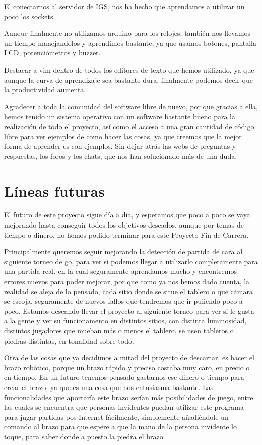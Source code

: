 \documentclass[12pt,a4paper]{report}
\begin{document}
El conectarnos al servidor de IGS, nos ha hecho que aprendamos a utilizar un
poco los sockets.

Aunque finalmente no utilizamos arduino para los relojes, también nos llevamos
un tiempo manejandolos y aprendimos bastante, ya que usamos botones, pantalla
LCD, potenciómetros y buzzer.

Destacar a vim dentro de todos los editores de texto que hemos utilizado, ya que
aunque la curva de aprendizaje sea bastante dura, finalmente podemos decir que
la productividad aumenta. 

Agradecer a toda la comunidad del software libre de nuevo, por que gracias a
ella, hemos tenido un sistema operativo con un software bastante bueno para la
realización de todo el proyecto, así como el acceso a una gran cantidad de
código libre para ver ejemplos de como hacer las cosas, ya que creemos que la
mejor forma de aprender es con ejemplos. Sin dejar atrás las webs de preguntas y
respuestas, los foros y los chats, que nos han solucionado más de una duda. 



\chapter{Líneas futuras}

El futuro de este proyecto sigue día a día, y esperamos que poco a poco se vaya
mejorando hasta conseguir todos los objetivos deseados, aunque por temas de
tiempo o dinero, no hemos podido terminar para este Proyecto Fin de Carrera. 

Principalmente queremos seguir mejorando la detección de partida de cara al
siguiente torneo de go, para ver si podemos llegar a utilizarlo completamente
para una partida real, en la cual seguramente aprendamos mucho y encontremos
errores nuevos para poder mejorar, por que como ya nos hemos dado cuenta, la
realidad se aleja de lo pensado, cada sitio donde se situe el tablero o que
cámara se escoja, seguramente de nuevos fallos que tendremos que ir puliendo
poco a poco. Estamos deseando llevar el proyecto al siguiente torneo para ver si
le gusta a la gente y ver su funcionamento en distintos sitios, con distinta
luminosidad, distintos jugadores que mueban más o menos el tablero, se usen
tableros o piedras distintas, en tonalidad sobre todo. 

Otra de las cosas que ya decidimos a mitad del proyecto de descartar, es hacer
el brazo robótico, porque un brazo rápido y preciso costaba muy caro, en precio
o en tiempo. En un futuro tenemos pensado gastarnos ese dinero o tiempo para
crear el brazo, ya que es una cosa que nos entusiasma bastante. Las
funcionalidades que aportaría este brazo serían más posibilidades de juego,
entre las cuales se encuentra que personas invidentes puedan utilizar este
programa para jugar partidas pos Internet fácilmente, simplemente añadiéndole un
comando al brazo para que espere a que la mano de la persona invidente lo toque,
para saber donde a puesto la piedra el brazo. 
\end{document}
